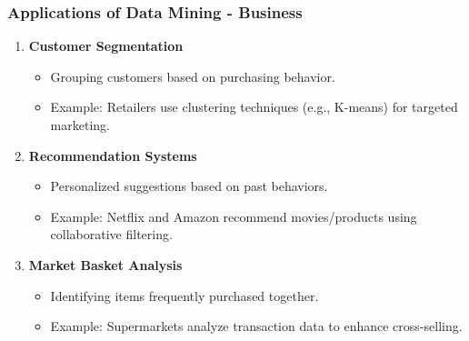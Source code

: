 \documentclass[aspectratio=169]{beamer}
\begin{document}
\begin{frame}[fragile]
    \frametitle{Applications of Data Mining - Business}
    \begin{enumerate}
        \item \textbf{Customer Segmentation}
            \begin{itemize}
                \item Grouping customers based on purchasing behavior.
                \item Example: Retailers use clustering techniques (e.g., K-means) for targeted marketing.
            \end{itemize}
        \item \textbf{Recommendation Systems}
            \begin{itemize}
                \item Personalized suggestions based on past behaviors.
                \item Example: Netflix and Amazon recommend movies/products using collaborative filtering.
            \end{itemize}
        \item \textbf{Market Basket Analysis}
            \begin{itemize}
                \item Identifying items frequently purchased together.
                \item Example: Supermarkets analyze transaction data to enhance cross-selling.
            \end{itemize}
    \end{enumerate}
\end{frame}
\end{document}
